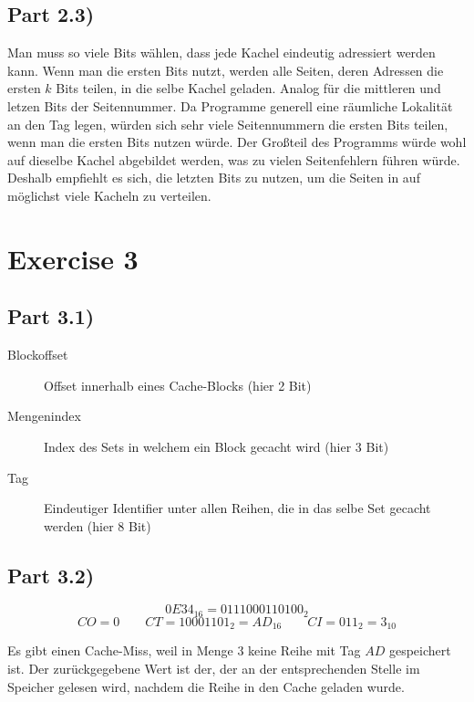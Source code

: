 \documentclass[10pt,a4paper]{article}
\begin{document}
\subsection*{Part 2.3)}

Man muss so viele Bits wählen, dass jede Kachel eindeutig adressiert werden kann.
Wenn man die ersten Bits nutzt, werden alle Seiten, deren Adressen die ersten $k$ Bits teilen, in die selbe Kachel geladen.
Analog für die mittleren und letzen Bits der Seitennummer.
Da Programme generell eine räumliche Lokalität an den Tag legen, würden sich sehr viele Seitennummern die ersten Bits teilen, wenn man die ersten Bits nutzen würde.
Der Großteil des Programms würde wohl auf dieselbe Kachel abgebildet werden, was zu vielen Seitenfehlern führen würde.
Deshalb empfiehlt es sich, die letzten Bits zu nutzen, um die Seiten in auf möglichst viele Kacheln zu verteilen.

\section*{Exercise 3}

\subsection*{Part 3.1)}

\begin{description}
\item[Blockoffset] Offset innerhalb eines Cache-Blocks (hier 2 Bit)
\item[Mengenindex] Index des Sets in welchem ein Block gecacht wird (hier 3 Bit)
\item[Tag] Eindeutiger Identifier unter allen Reihen, die in das selbe Set gecacht werden (hier 8 Bit)
\end{description}

\subsection*{Part 3.2)}

\begin{equation*}
  0E34_{16} = 0111000110100_{2}
\end{equation*}
\begin{equation*}
  CO = 0 \qquad CT = 10001101_{2} = AD_{16} \qquad CI = 011_{2} = 3_{10}
\end{equation*}

Es gibt einen Cache-Miss, weil in Menge $3$ keine Reihe mit Tag $AD$ gespeichert ist.
Der zurückgegebene Wert ist der, der an der entsprechenden Stelle im Speicher gelesen wird, nachdem die Reihe in den Cache geladen wurde.
\end{document}
